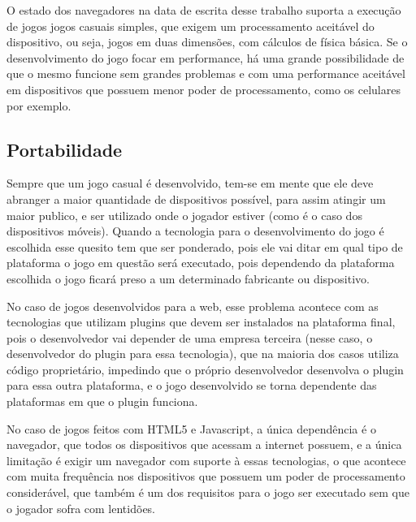 O estado dos navegadores na data de escrita desse
trabalho suporta a execução de jogos jogos casuais simples, que exigem
um processamento aceitável do dispositivo, ou seja, jogos em duas
dimensões, com cálculos de física básica. Se o desenvolvimento do jogo
focar em performance, há uma grande possibilidade de que o mesmo
funcione sem grandes problemas e com uma performance aceitável em dispositivos
que possuem menor poder de processamento, como os celulares por exemplo.

\subsection{Portabilidade}


Sempre que um jogo casual é desenvolvido, tem-se em mente que ele deve
abranger a maior quantidade de dispositivos possível, para assim
atingir um maior publico, e ser utilizado onde o jogador estiver (como
é o caso dos dispositivos móveis). Quando a tecnologia para o
desenvolvimento do jogo é escolhida esse quesito tem que ser
ponderado, pois ele vai ditar em qual tipo de plataforma o jogo em
questão será executado, pois dependendo da plataforma escolhida o jogo ficará preso
a um determinado fabricante ou dispositivo.

No caso de jogos desenvolvidos para a web, esse problema acontece com as
tecnologias que utilizam plugins que devem ser instalados na
plataforma final, pois o desenvolvedor vai depender de uma empresa
terceira (nesse caso, o desenvolvedor do plugin para essa tecnologia),
que na maioria dos casos utiliza código proprietário, impedindo que o
próprio desenvolvedor desenvolva o plugin para essa outra plataforma,
e o jogo desenvolvido se torna dependente das plataformas em que o plugin
funciona.

No caso de jogos feitos com HTML5 e Javascript, a única dependência é
o navegador, que todos os dispositivos que acessam a internet possuem,
e a única limitação é exigir um navegador com suporte à essas
tecnologias, o que acontece com muita frequência nos dispositivos que
possuem um poder de processamento considerável, que também é um dos
requisitos para o jogo ser executado sem que o jogador sofra com
lentidões.

